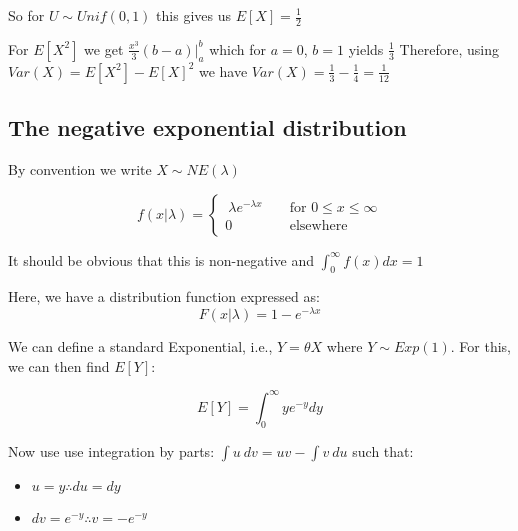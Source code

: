 \documentclass[12pt]{extbook}
\begin{document}
So for $U \sim Unif(0,1)$ this gives us $E[X] = \frac{1}{2}$

For $E[X^2]$ we get $\frac{x^3}{3}(b-a)|^b_a$ which for $a=0$, $b=1$ yields $\frac{1}{3}$  Therefore, using $Var(X)=E[X^2]-E[X]^2$ we have $Var(X)=\frac{1}{3}-\frac{1}{4}=\frac{1}{12}$






\subsection{The negative exponential distribution}

{\color{green} By convention we write $X \sim NE(\lambda)$}

\begin{displaymath}
f(x|\lambda) = \left\{ \begin{array}{rrr} \  \lambda e^{-\lambda x} & & \mbox{ for } 0 \leq x \leq \infty \\ 0 & & \mbox{ elsewhere } \end{array} \right.
\end{displaymath}

It should be obvious that this is non-negative and $\int_0^{\infty}f(x)dx=1$

Here, we have a distribution function expressed as:
\begin{displaymath}
F(x|\lambda) = 1-e^{-\lambda x}
\end{displaymath}





We can define a standard Exponential, i.e., $Y=\theta X$ where $Y \sim Exp(1)$.
For this, we can then find $E[Y]$:

\begin{displaymath}
E[Y] = \int_{0}^{\infty} y e^{-y}dy
\end{displaymath}

Now use use integration by parts: $\int u\ dv = uv - \int v\ du$ such that:
\begin{itemize}
\item[] $u=y \therefore du=dy$
\item[] $dv=e^{-y} \therefore v=-e^{-y}$
\end{itemize}
\end{document}
